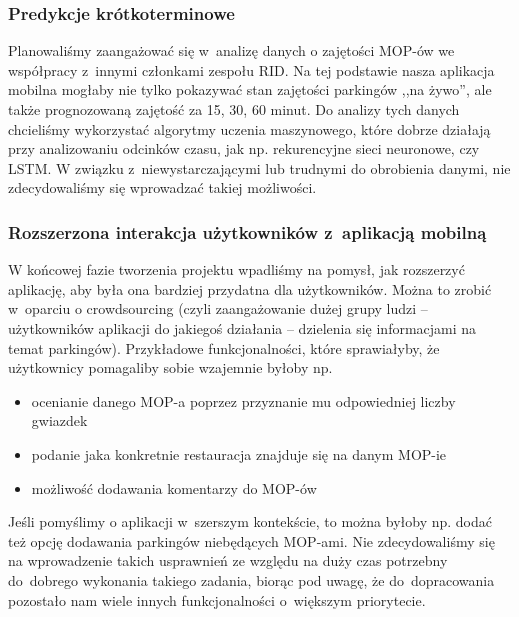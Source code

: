 \subsubsection{Predykcje krótkoterminowe}
Planowaliśmy zaangażować się w~analizę danych o zajętości MOP-ów we współpracy z~innymi członkami zespołu RID. Na tej podstawie nasza aplikacja mobilna mogłaby nie tylko pokazywać stan zajętości parkingów ,,na żywo'', ale także prognozowaną zajętość za 15, 30, 60 minut. Do analizy tych danych chcieliśmy wykorzystać algorytmy uczenia maszynowego, które dobrze działają przy analizowaniu odcinków czasu, jak np. rekurencyjne sieci neuronowe, czy LSTM. W związku z~niewystarczającymi lub trudnymi do obrobienia danymi, nie zdecydowaliśmy się wprowadzać takiej możliwości.
\subsubsection{Rozszerzona interakcja użytkowników z~aplikacją mobilną}
W końcowej fazie tworzenia projektu wpadliśmy na pomysł, jak rozszerzyć aplikację, aby była ona bardziej przydatna dla użytkowników. Można to zrobić w~oparciu o crowdsourcing (czyli zaangażowanie dużej grupy ludzi -- użytkowników aplikacji do jakiegoś działania -- dzielenia się informacjami na temat parkingów). Przykładowe funkcjonalności, które sprawiałyby, że użytkownicy pomagaliby sobie wzajemnie byłoby np.
\begin{itemize}
\item ocenianie danego MOP-a poprzez przyznanie mu odpowiedniej liczby gwiazdek
\item podanie jaka konkretnie restauracja znajduje się na danym MOP-ie
\item możliwość dodawania komentarzy do MOP-ów
\end{itemize}
Jeśli pomyślimy o aplikacji w~szerszym kontekście, to można byłoby np. dodać też opcję dodawania parkingów niebędących MOP-ami.
Nie zdecydowaliśmy się na wprowadzenie takich usprawnień ze względu na duży czas potrzebny do~dobrego wykonania takiego zadania, biorąc pod uwagę, że do~dopracowania pozostało nam wiele innych funkcjonalności o~większym priorytecie.

